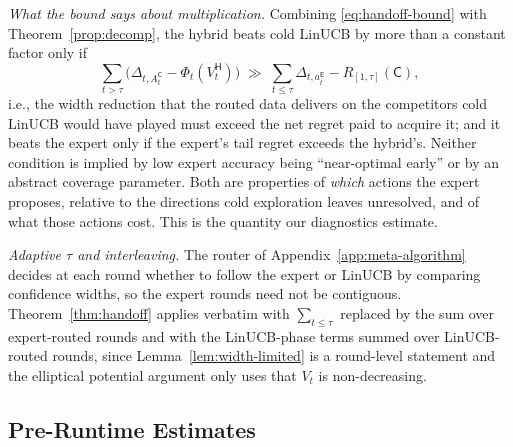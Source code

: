 \documentclass{article}
\theoremstyle{definition}
\theoremstyle{remark}
\theoremstyle{remark}
\newcommand{\Cold}{\mathsf{C}}
\newcommand{\Exp}{\mathsf{E}}
\newcommand{\Hyb}{\mathsf{H}}
\begin{document}
\emph{What the bound says about multiplication.} Combining
\eqref{eq:handoff-bound} with Theorem~\ref{prop:decomp}, the hybrid beats
cold LinUCB by more than a constant factor only if
\[
\sum_{t>\tau}\bigl(\Delta_{t,A^{\Cold}_t}-\Phi_t(V^{\Hyb}_t)\bigr)
\;\gg\;
\sum_{t\le\tau}\Delta_{t,a_t^{\Exp}}-R_{[1,\tau]}(\Cold),
\]
i.e., the width reduction that the routed data delivers on the competitors
cold LinUCB would have played must exceed the net regret paid to acquire it;
and it beats the expert only if the expert's tail regret exceeds the hybrid's.
Neither condition is implied by low expert accuracy being ``near-optimal
early'' or by an abstract coverage parameter. Both are properties of
\emph{which} actions the expert proposes, relative to the directions cold
exploration leaves unresolved, and of what those actions cost. This is the
quantity our diagnostics estimate.

\emph{Adaptive $\tau$ and interleaving.} The router of
Appendix~\ref{app:meta-algorithm} decides at each round whether to follow the
expert or LinUCB by comparing confidence widths, so the expert rounds need not
be contiguous. Theorem~\ref{thm:handoff} applies verbatim with
$\sum_{t\le\tau}$ replaced by the sum over expert-routed rounds and with the
LinUCB-phase terms summed over LinUCB-routed rounds, since
Lemma~\ref{lem:width-limited} is a round-level statement and the elliptical
potential argument only uses that $V_t$ is non-decreasing.


\subsection{Pre-Runtime Estimates}
\label{sec:diagnostics}
\end{document}
